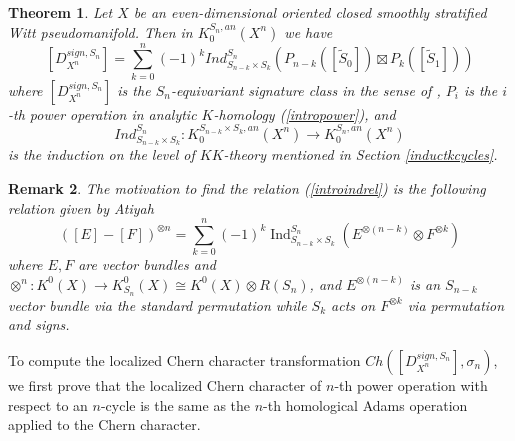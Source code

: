 \documentclass[11pt,leqno,twoside]{amsart}
\theoremstyle{plainsl}
\newtheorem{theorem}{Theorem}[section]
\newtheorem{remark}[theorem]{Remark}
\theoremstyle{definition}
\begin{document}
\begin{theorem}\label{introtheoreminductform}
    Let $X$ be an even-dimensional oriented closed smoothly stratified Witt pseudomanifold. Then in $K^{S_n,an}_0(X^n)$ we have
    \begin{equation}\label{introindrel}
        \left[D^{sign,S_n}_{X^n}\right]=\sum^n_{k=0}(-1)^kInd_{S_{n-k}\times S_k}^{S_n}\left(P_{n-k}([\widetilde S_0])\boxtimes P_{k}([\widetilde S_1])\right)
    \end{equation}
    where $\left[D^{sign,S_n}_{X^n}\right]$ is the $S_n$-equivariant signature class in the sense of \cite{BLP}, $P_i$ is the $i$-th power operation in analytic $K$-homology (\ref{intropower}), and 
      $$Ind_{S_{n-k}\times S_k}^{S_n}:K_0^{S_{n-k}\times S_k,an}(X^{n})\rightarrow K_0^{S_{n},an}(X^{n})$$
    is the induction on the level of $KK$-theory mentioned in Section \ref{inductkcycles}.
\end{theorem}
\begin{remark}
    The motivation to find the relation  (\ref{introindrel}) is the following relation given by Atiyah \cite[proof of Prop. 2.3]{At} 
   \[ ([E]-[F])^{\otimes n}=
\sum_{k=0}^n (-1)^k
\operatorname{Ind}_{S_{n-k}\times S_k}^{S_n}
\left(
E^{\otimes(n-k)}\otimes F^{\otimes k}
\right)
\]
where $E,F$ are vector bundles and $\otimes^ n:K^0(X)\rightarrow K_{S_n}^0(X)\cong K^0(X)\otimes R(S_n)$, and $E^{\otimes(n-k)}$ is an $S_{n-k}$ vector bundle via the standard permutation while $S_k$ acts on $F^{\otimes k}$ via permutation and signs. 
\end{remark}




























To compute the localized Chern character transformation $Ch(\left[D^{sign,S_n}_{X^n}\right],\sigma_n)$, we first prove that the localized Chern character of $n$-th power operation with respect to an
$n$-cycle is the same as the $n$-th homological Adams operation applied to the Chern character. 
\end{document}

